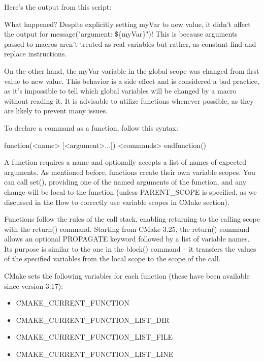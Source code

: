 Here’s the output from this script:


What happened? Despite explicitly setting myVar to new value, it didn’t affect the output for message("argument: \$\{myVar\}")! This is because arguments passed to macros aren’t treated as real variables but rather, as constant find-and-replace instructions.

On the other hand, the myVar variable in the global scope was changed from first value to new value. This behavior is a side effect and is considered a bad practice, as it’s impossible to tell which global variables will be changed by a macro without reading it. It is advisable to utilize functions whenever possible, as they are likely to prevent many issues.


To declare a command as a function, follow this syntax:

\begin{shell}
function(<name> [<argument>...])
    <commands>
endfunction()
\end{shell}

A function requires a name and optionally accepts a list of names of expected arguments. As mentioned before, functions create their own variable scopes. You can call set(), providing one of the named arguments of the function, and any change will be local to the function (unless PARENT\_SCOPE is specified, as we discussed in the How to correctly use variable scopes in CMake section).

Functions follow the rules of the call stack, enabling returning to the calling scope with the return() command. Starting from CMake 3.25, the return() command allows an optional PROPAGATE keyword followed by a list of variable names. Its purpose is similar to the one in the block() command – it transfers the values of the specified variables from the local scope to the scope of the call.

CMake sets the following variables for each function (these have been available since version 3.17):

\begin{itemize}
\item
CMAKE\_CURRENT\_FUNCTION

\item
CMAKE\_CURRENT\_FUNCTION\_LIST\_DIR

\item
CMAKE\_CURRENT\_FUNCTION\_LIST\_FILE

\item
CMAKE\_CURRENT\_FUNCTION\_LIST\_LINE
\end{itemize}


